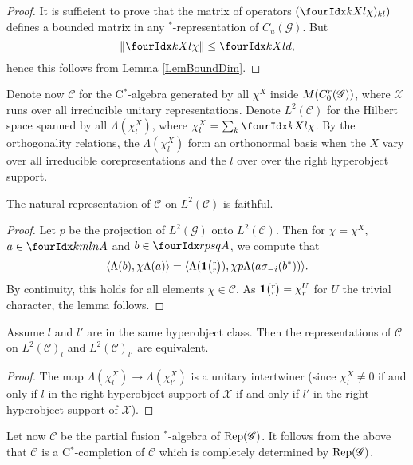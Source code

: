 \begin{proof} It is sufficient to prove that the matrix of operators $(\Gr{\chi}{}{X}{k}{l})_{kl})$ defines a bounded matrix in any $^*$-representation of $C_u(\mathscr{G})$. But \[\| \Gr{\chi}{}{X}{k}{l}\| \leq \Gr{d}{}{X}{k}{l},\] hence this follows from Lemma \ref{LemBoundDim}.
\end{proof} 
 
Denote now $\mathcal{C}$ for the C$^*$-algebra generated by all $\chi^X$ inside $M(C^{r}_{0}(\mathscr{G}))$, where $\mathscr{X}$ runs over all irreducible unitary representations. Denote $L^2(\mathcal{C})$ for the Hilbert space spanned by all $\Lambda(\chi^X_l)$, where $\chi^X_l = \sum_{k} \Gr{\chi}{}{X}{k}{l}$. By the orthogonality relations, the $\Lambda(\chi^X_l)$ form an orthonormal basis when the $X$ vary over all irreducible corepresentations and the $l$ over over the right hyperobject support.
 
\begin{Lem} The natural representation of $\mathcal{C}$ on $L^2(\mathcal{C})$ is faithful.
\end{Lem} 

\begin{proof} Let $p$ be the projection of $L^2(\mathscr{G})$ onto $L^2(\mathcal{C})$. Then for $\chi = \chi^X$, $a\in \Gr{A}{k}{l}{m}{n}$ and $b\in \Gr{A}{r}{s}{p}{q}$, we compute that \[\langle \Lambda(b),\chi \Lambda(a)\rangle =  \langle \Lambda( \mathbf{1}{\tiny {\begin{pmatrix} r\\r\end{pmatrix}}}),\chi p\Lambda(a\sigma_{-i}(b^*))\rangle.\] By continuity, this holds for all elements $\chi \in \mathcal{C}$. As $\mathbf{1}{\tiny {\begin{pmatrix} r\\r\end{pmatrix}}} = \chi^U_r$ for $U$ the trivial character, the lemma follows.
\end{proof}

\begin{Lem} Assume $l$ and $l'$ are in the same hyperobject class. Then the representations of $\mathcal{C}$ on $L^2(\mathcal{C})_l$ and $L^2(\mathcal{C})_{l'}$ are equivalent.
\end{Lem} 
\begin{proof} The map $\Lambda(\chi^X_l)\rightarrow \Lambda(\chi^X_{l'})$ is a unitary intertwiner (since $\chi^X_l\neq 0$ if and only if $l$ in the right hyperobject support of $\mathscr{X}$ if and only if $l'$ in the right hyperobject support of $\mathscr{X}$).
\end{proof} 

Let now $\mathscr{C}$ be the partial fusion $^*$-algebra of $\mathrm{Rep}(\mathscr{G})$. It follows from the above that $\mathcal{C}$ is a C$^*$-completion of $\mathscr{C}$ which is completely determined by $\mathrm{Rep}(\mathscr{G})$.

